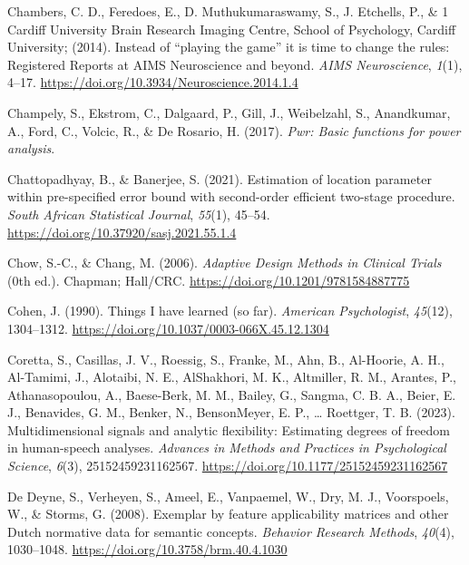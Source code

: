 \documentclass[
  man]{apa7}
\newlength{\cslhangindent}
\newenvironment{CSLReferences}[2] %
 {\begin{list}{}{%
  \setlength{\itemindent}{0pt}
  \setlength{\leftmargin}{0pt}
  \setlength{\parsep}{0pt}
  \ifodd #1
   \setlength{\leftmargin}{\cslhangindent}
   \setlength{\itemindent}{-1\cslhangindent}
  \fi
  \setlength{\itemsep}{#2\baselineskip}}}
 {\end{list}}
\begin{document}
\begin{CSLReferences}{1}{0}
Chambers, C. D., Feredoes, E., D. Muthukumaraswamy, S., J. Etchells, P., \& 1 Cardiff University Brain Research Imaging Centre, School of Psychology, Cardiff University; (2014). Instead of {``}playing the game{''} it is time to change the rules: Registered Reports at AIMS Neuroscience and beyond. \emph{AIMS Neuroscience}, \emph{1}(1), 4--17. \url{https://doi.org/10.3934/Neuroscience.2014.1.4}

Champely, S., Ekstrom, C., Dalgaard, P., Gill, J., Weibelzahl, S., Anandkumar, A., Ford, C., Volcic, R., \& De Rosario, H. (2017). \emph{Pwr: Basic functions for power analysis}.

Chattopadhyay, B., \& Banerjee, S. (2021). Estimation of location parameter within pre-specified error bound with second-order efficient two-stage procedure. \emph{South African Statistical Journal}, \emph{55}(1), 45--54. \url{https://doi.org/10.37920/sasj.2021.55.1.4}

Chow, S.-C., \& Chang, M. (2006). \emph{Adaptive Design Methods in Clinical Trials} (0th ed.). Chapman; Hall/CRC. \url{https://doi.org/10.1201/9781584887775}

Cohen, J. (1990). Things I have learned (so far). \emph{American Psychologist}, \emph{45}(12), 1304--1312. \url{https://doi.org/10.1037/0003-066X.45.12.1304}

Coretta, S., Casillas, J. V., Roessig, S., Franke, M., Ahn, B., Al-Hoorie, A. H., Al-Tamimi, J., Alotaibi, N. E., AlShakhori, M. K., Altmiller, R. M., Arantes, P., Athanasopoulou, A., Baese-Berk, M. M., Bailey, G., Sangma, C. B. A., Beier, E. J., Benavides, G. M., Benker, N., BensonMeyer, E. P., \ldots{} Roettger, T. B. (2023). Multidimensional signals and analytic flexibility: Estimating degrees of freedom in human-speech analyses. \emph{Advances in Methods and Practices in Psychological Science}, \emph{6}(3), 25152459231162567. \url{https://doi.org/10.1177/25152459231162567}

De Deyne, S., Verheyen, S., Ameel, E., Vanpaemel, W., Dry, M. J., Voorspoels, W., \& Storms, G. (2008). Exemplar by feature applicability matrices and other Dutch normative data for semantic concepts. \emph{Behavior Research Methods}, \emph{40}(4), 1030--1048. \url{https://doi.org/10.3758/brm.40.4.1030}


\end{CSLReferences}
\end{document}
